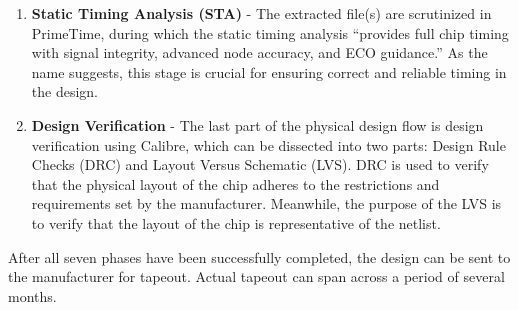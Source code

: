 \documentclass[conference]{IEEEtran}
\begin{document}
\begin{enumerate}
    \item \textbf{Static Timing Analysis (STA)} - The extracted file(s) are scrutinized in PrimeTime, during which the static timing analysis “provides full chip timing with signal integrity, advanced node accuracy, and ECO guidance.” \cite{b6} As the name suggests, this stage is crucial for ensuring correct and reliable timing in the design.
    
    \item \textbf{Design Verification} -  The last part of the physical design flow is design verification using Calibre, which can be dissected into two parts: Design Rule Checks (DRC) and Layout Versus Schematic (LVS). DRC is used to verify that the physical layout of the chip adheres to the restrictions and requirements set by the manufacturer. Meanwhile, the purpose of the LVS is to verify that the layout of the chip is representative of the netlist.

\end{enumerate}

After all seven phases have been successfully completed, the design can be sent to the manufacturer for tapeout. Actual tapeout can span across a period of several months. 
\end{document}
